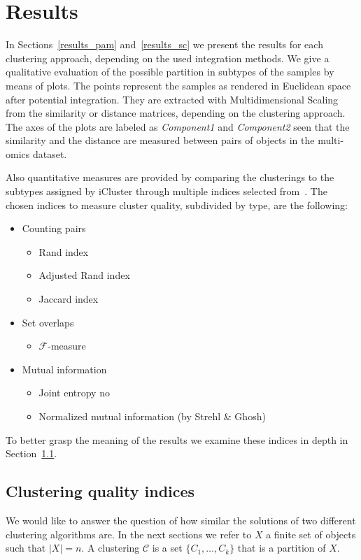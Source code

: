 \chapter{Results}

In Sections~\ref{results_pam} and~\ref{results_sc} we present the results for each clustering approach, depending on the used integration methods. We give a qualitative evaluation of the possible partition in subtypes of the samples by means of plots. The points represent the samples as rendered in Euclidean space after potential integration. They are extracted with Multidimensional Scaling from the similarity or distance matrices, depending on the clustering approach. The axes of the plots are labeled as \textit{Component1} and \textit{Component2} seen that the similarity and the distance are measured between pairs of objects in the multi-omics dataset.

Also quantitative measures are provided by comparing the clusterings to the subtypes assigned by iCluster through multiple indices selected from~\cite{wagner2007comparing}. The chosen indices to measure cluster quality, subdivided by type, are the following:
\begin{itemize}
    \item Counting pairs
    \begin{itemize}             
        \item Rand index
        \item Adjusted Rand index
        \item Jaccard index
    \end{itemize}
    \item Set overlaps
    \begin{itemize}
        \item $\mathcal{F}$-measure
    \end{itemize}
    \item Mutual information
    \begin{itemize}
        \item Joint entropy
no        \item Normalized mutual information (by Strehl \& Ghosh)
    \end{itemize}
\end{itemize}
To better grasp the meaning of the results we examine these indices in depth in Section~\ref{results_indices}.





\section{Clustering quality indices}\label{results_indices}
We would like to answer the question of how similar the solutions of two different clustering algorithms are. In the next sections we refer to $X$ a finite set of objects such that $|X|=n$. A clustering $\mathcal{C}$ is a set $\{C_1,\dots,C_k\}$ that is a partition of $X$.


